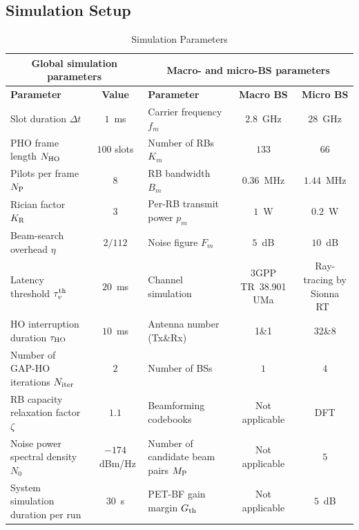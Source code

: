 \documentclass[10pt,journal,letterpaper]{journal_template/IEEEtran}
\newcommand{\rev}[1]{\textcolor{revisioncolor}{{}#1}}
\newif\ifshowdeletions
\newcommand{\currentdel}[1]{\ifshowdeletions\textcolor{deletioncolor}{\sout{#1}}\fi}
\theoremstyle{remark}
\begin{document}
\subsection{Simulation Setup}

\begin{table}[htbp]
    \centering
    \caption{Simulation Parameters}
    \label{tab:sim-params}
    \setlength{\tabcolsep}{4pt}
    \begin{tabular*}{\textwidth}{@{\extracolsep{\fill}}l c | l c c}
        \hline
        \multicolumn{2}{c|}{\textbf{Global simulation parameters}}
        & \multicolumn{3}{c}{\textbf{Macro- and micro-BS parameters}} \\
        \hline
        \textbf{Parameter} & \textbf{Value}
        & \textbf{Parameter} & \textbf{Macro BS} & \textbf{Micro BS} \\
        \hline
        Slot duration $\Delta t$ & $1$~ms
        & Carrier frequency $f_m$ & $2.8$~GHz & $28$~GHz \\

        PHO frame length $N_{\rm HO}$ & $100$ slots
        & Number of RBs $K_m$ & $133$ & $66$ \\

        Pilots per frame $N_{\rm P}$ & $8$
        & RB bandwidth $B_m$ & $0.36$~MHz & $1.44$~MHz \\

        Rician factor $K_{\rm R}$ & $3$
        & Per-RB transmit power $p_m$ & $1$~W & $0.2$~W \\

        Beam-search overhead $\eta$ & $2/112$
        & Noise figure $F_m$ & $5$~dB & $10$~dB \\

        Latency threshold \currentdel{$\tau_{\rm th}$}\rev{$\tau_v^{\rm th}$} & $20$~ms
        & Channel simulation &
        3GPP TR~38.901 UMa & Ray-tracing by Sionna RT~\cite{sionnaRT} \\

        \rev{HO interruption duration $\tau_{\rm HO}$} & \rev{$10$~ms}
        & Antenna number (Tx\&Rx) & 1\&1 & 32\&8 \\

        \rev{Number of GAP-HO iterations $N_{\rm iter}$} & \rev{$2$}
        & \rev{Number of BSs} & \rev{$1$} & \rev{$4$}\\

        \rev{RB capacity relaxation factor $\zeta$} & \rev{$1.1$}
        & \rev{Beamforming codebooks} & \rev{Not applicable} & \rev{DFT} \\

        Noise power spectral density $N_0$ & $-174$~dBm/Hz
        & \rev{Number of candidate beam pairs $M_{\rm P}$} & \rev{Not applicable} & \rev{$5$} \\

        \rev{System simulation duration per run} & \rev{$30$~s}
        & \rev{PET-BF gain margin $G_{\rm th}$} & \rev{Not applicable} & \rev{$5$~dB} \\
        \hline
    \end{tabular*}
\end{table}
\end{document}
